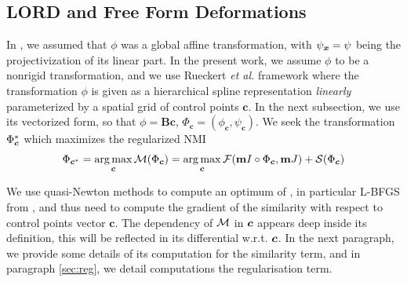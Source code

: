 \documentclass[twocolumn]{svjour3}
\begin{document}
\subsection{LORD and Free Form Deformations}
In \cite{jensen2015locally}, we assumed that $\phi$ was a global affine transformation,
with $\psi_{\boldsymbol{x}} = \psi$ being the projectivization of its linear part. In the present work,
we assume $\phi$ to be a nonrigid transformation, and we use Rueckert \textit{et al.\/}
framework \cite{rueckert1999nonrigid} where the transformation $\phi$ is given as a
hierarchical spline representation \emph{linearly} parameterized by a spatial grid of
control points ${\bm c}$. In the next subsection, we use its vectorized form, so that
$\phi = \bm B\bm c$, $\Phi_{\bm c} = (\phi_{\bm c},\psi_{\bm c})$. We seek the
transformation $\Phi^*_{\boldsymbol{c}}$ which maximizes the regularized NMI
\begin{align}
  \Phi_{\boldsymbol{c}^*} = \operatorname*{arg\,max}_{\boldsymbol{c}} \mathcal M(\Phi_{\boldsymbol{c}}) = \operatorname*{arg\,max}_{\boldsymbol{c}} \mathcal F({\bf m} I\circ\Phi_{\boldsymbol{c}},{\bf m} J)+\mathcal S({\Phi_{\boldsymbol{c}}})
    \label{eq:argmax}
\end{align}

We use quasi-Newton methods to compute an optimum of , in particular
L-BFGS from \cite{schmidt2005minfunc}, and thus need to compute the gradient of the
similarity with respect to control points vector $\bm c$. 
The dependency of ${\mathcal M}$ in $\boldsymbol{c}$ appears deep inside its definition, 
this will be reflected in its differential w.r.t. $\boldsymbol{c}$. In the next paragraph, we provide some 
details of its computation for the similarity term, and in paragraph \ref{sec:reg}, 
we detail computations the regularisation term.
\end{document}
